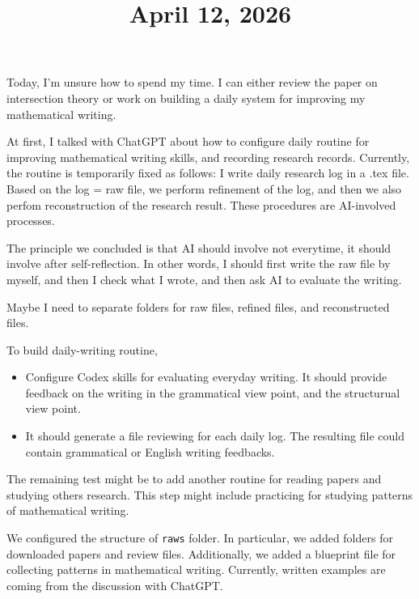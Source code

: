 \documentclass[11pt]{amsart}
\title{April 12, 2026}
\begin{document}
\maketitle

Today, I’m unsure how to spend my time. I can either review the paper on intersection theory or work on building a daily system for improving my mathematical writing.
\par\vspace{1em}
At first, I talked with ChatGPT about how to configure daily routine for improving mathematical writing skills, and recording research records.
Currently, the routine is temporarily fixed as follows: I write daily research log in a .tex file.
Based on the log = raw file, we perform refinement of the log, and then we also perfom reconstruction of the research result.
These procedures are AI-involved processes.

The principle we concluded is that AI should involve not everytime, it should involve after self-reflection.
In other words, I should first write the raw file by myself, and then I check what I wrote, and then ask AI to evaluate the writing. 

Maybe I need to separate folders for raw files, refined files, and reconstructed files.

\par\vspace{1em}
\begin{todo} To build daily-writing routine,
    \begin{itemize}
        \item Configure Codex skills for evaluating everyday writing.
        It should provide feedback on the writing in the grammatical view point, and the structurual view point.
        \item It should generate a file reviewing for each daily log.
        The resulting file could contain grammatical or English writing feedbacks.
    \end{itemize}    
\end{todo}

The remaining test might be to add another routine for reading papers and studying others research.
This step might include practicing for studying patterns of mathematical writing.
\par\vspace{1em}
We configured the structure of \texttt{raws} folder.
In particular, we added folders for downloaded papers and review files.
Additionally, we added a blueprint file for collecting patterns in mathematical writing.
Currently, written examples are coming from the discussion with ChatGPT.
\end{document}

